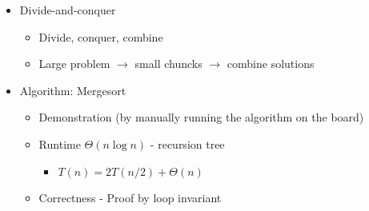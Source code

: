 \begin{itemize}
    \item Divide-and-conquer
    \begin{itemize}
        \item Divide, conquer, combine
        \item Large problem $\to$ small chuncks $\to$ combine solutions
    \end{itemize}
    \item Algorithm: Mergesort
    \begin{itemize}
        \item Demonstration (by manually running the algorithm on the board)
        \item Runtime $\Theta(n\log n)$ - recursion tree
        \begin{itemize}
            \item $T(n)=2T(n/2)+ \Theta(n)$
        \end{itemize}
        \item Correctness - Proof by loop invariant
    \end{itemize}
\end{itemize}
